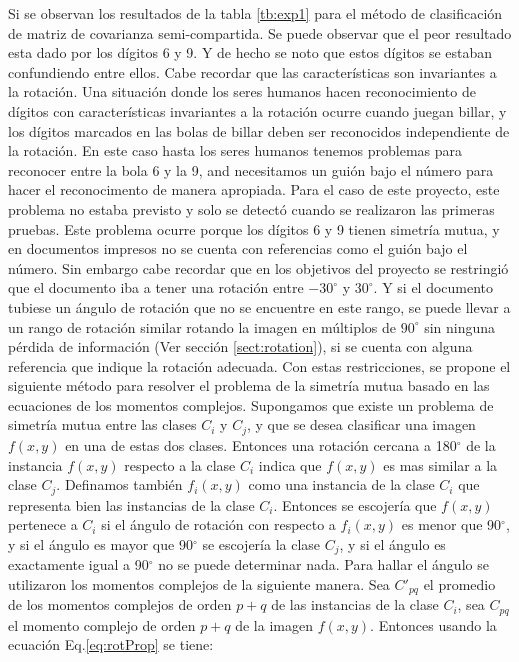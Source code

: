 \documentclass[a4paper, 11pt, oneside]{report}
\begin{document}
Si se observan los resultados de la tabla \ref{tb:exp1} para el método de clasificación de matriz de covarianza semi-compartida. Se puede observar que el peor resultado esta dado por los dígitos 6 y 9. Y de hecho se noto que estos dígitos se estaban confundiendo entre ellos. 
Cabe recordar que las características son invariantes a la rotación. Una situación donde los seres humanos hacen reconocimiento de dígitos con características invariantes a la rotación ocurre cuando juegan billar, y los dígitos marcados en las bolas de billar deben ser reconocidos independiente de la rotación. En este caso hasta los seres humanos tenemos problemas para reconocer entre la bola 6 y la 9, and necesitamos un guión bajo el número para hacer el reconocimento de manera apropiada.\newline \newline
Para el caso de este proyecto, este problema no estaba previsto y solo se detectó cuando se realizaron las primeras pruebas. Este problema ocurre porque los dígitos 6 y 9 tienen simetría mutua, y en documentos impresos no se cuenta con referencias como el guión bajo el número. Sin embargo cabe recordar que en los objetivos del proyecto se restringió que el documento iba a tener una rotación entre $-30^\circ$ y $30^\circ$. Y si el documento tubiese un ángulo de rotación que no se encuentre en este rango, se puede llevar a un rango de rotación similar rotando la imagen en múltiplos de $90^\circ$ sin ninguna pérdida de información (Ver sección \ref{sect:rotation}), si se cuenta con alguna referencia que indique la rotación adecuada. \newline \newline
Con estas restricciones, se propone el siguiente método para resolver el problema de la simetría mutua basado en las ecuaciones de los momentos complejos. Supongamos que existe un problema de simetría mutua entre las clases $C_i$ y $C_j$, y que se desea clasificar una imagen $f(x,y)$ en una de estas dos clases. Entonces una rotación cercana a 180$^\circ$ de la instancia $f(x,y)$ respecto a la clase $C_i$ indica que $f(x,y)$ es mas similar a la clase $C_j$. Definamos también $f_i(x,y)$ como una instancia de la clase $C_i$ que representa bien las instancias de la clase $C_i$. Entonces se escojería que $f(x,y)$ pertenece a $C_i$ si el ángulo de rotación con respecto a $f_i(x,y)$ es menor que 90$^\circ$, y si el ángulo es mayor que 90$^\circ$ se escojería la clase $C_j$, y si el ángulo es exactamente igual a 90$^\circ$ no se puede determinar nada. \newline \newline
Para hallar el ángulo se utilizaron los momentos complejos de la siguiente manera. Sea $C'_{pq}$ el promedio de los momentos complejos de orden $p+q$ de las instancias de la clase $C_i$, sea $C_{pq}$ el momento complejo de orden $p+q$ de la imagen $f(x,y)$.
Entonces usando la ecuación Eq.\ref{eq:rotProp} se tiene:
\end{document}
